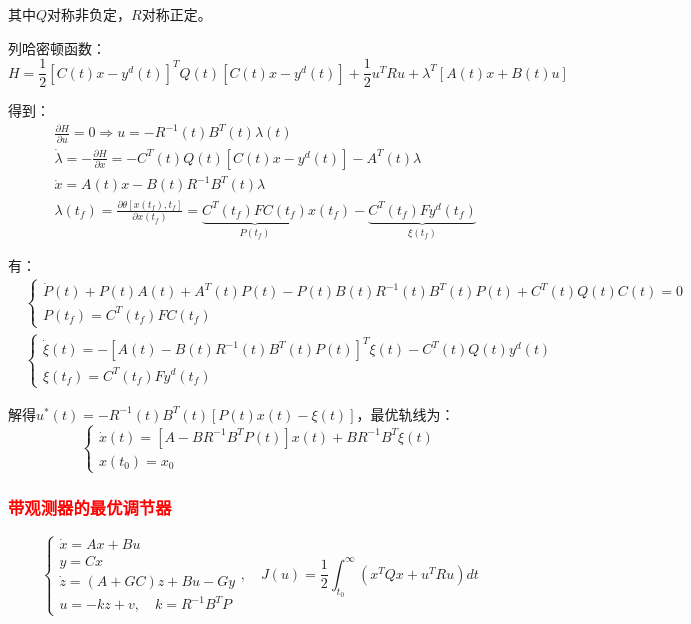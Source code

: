 \documentclass[
12pt, %
a4paper, 
oneside, %
]{scrartcl}
\begin{document}
其中$ Q $对称非负定，$ R $对称正定。

列哈密顿函数：
$$ H = \frac{1}{2}[C(t)x - y^d(t)]^T Q(t) [C(t)x - y^d(t)] + \frac{1}{2} u^T R u + \lambda^T [A(t) x + B(t) u] $$

得到：
\begin{align*} 
&\frac{\partial H}{\partial u} = 0 \Rightarrow u = -R^{-1}(t) B^T(t) \lambda(t) \\ 
&\dot{\lambda} = -\frac{\partial H}{\partial x} = -C^T(t) Q(t) [C(t) x - y^d(t)] - A^T(t) \lambda \\ 
&\dot{x} = A(t) x - B(t) R^{-1} B^T(t) \lambda \\
&\lambda(t_f) = \frac{\partial \theta[x(t_f), t_f]}{\partial x(t_f)} = \underbrace{C^T(t_f) F C(t_f)}_{P(t_f)} x(t_f) - \underbrace{C^T(t_f) F y^d(t_f)}_{\xi(t_f)}
\end{align*}

有：
\begin{align*}
&\begin{cases} \dot{P}(t) + P(t) A(t) + A^T(t) P(t) - P(t) B(t) R^{-1}(t) B^T(t) P(t) + C^T(t) Q(t) C(t) = 0 \\ P(t_f) = C^T(t_f) F C(t_f) \end{cases} \\
&\begin{cases} \dot{\xi}(t) = -[A(t) - B(t) R^{-1}(t) B^T(t) P(t)]^T \xi(t) - C^T(t) Q(t) y^d(t) \\ \xi(t_f) = C^T(t_f) F y^d(t_f) \end{cases}
\end{align*}

解得$ u^*(t) = -R^{-1}(t) B^T(t) [P(t) x(t) - \xi(t)] $，最优轨线为：
$$ \begin{cases} \dot{x}(t) = [A - B R^{-1} B^T P(t)] x(t) + B R^{-1} B^T \xi(t) \\ x(t_0) = x_0 \end{cases} $$
\subsubsection[带观测器的最优调节器]{\textcolor{red}{带观测器的最优调节器}}
$$ \begin{cases} \dot{x} = A x + B u \\ y = C x \\ \dot{z} = (A + GC)z + B u - G y \\ u = -k z + v, \quad k = R^{-1} B^T P \end{cases}, \quad J(u) = \frac{1}{2} \int_{t_0}^{\infty} (x^T Q x + u^T R u) d t $$
\end{document}
